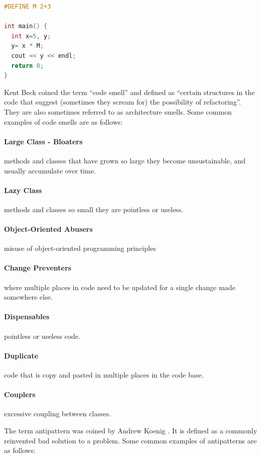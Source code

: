 \documentclass[conference]{IEEEtran}
\begin{document}
\begin{lstlisting}[language=C,frame=single,caption=Example Atom of Confusion,label=pattern1]
#DEFINE M 2+3

int main() {
  int x=5, y;
  y= x * M;
  cout << y << endl;
  return 0;
}
\end{lstlisting}

Kent Beck coined the term ``code smell'' \cite{fowler_refactoring:_2018} and defined as ``certain structures in the code that suggest (sometimes they scream for) the possibility of refactoring''. They are also sometimes referred to as architecture smells.
Some common examples of code smells are as follows:
\paragraph{Large Class - Bloaters} methods and classes that have grown so large they become unsustainable, and usually accumulate over time.
\paragraph{Lazy Class} methods and classes so small they are pointless or useless.
\paragraph{Object-Oriented Abusers} misuse of object-oriented programming principles
\paragraph{Change Preventers} where multiple places in code need to be updated for a single change made somewhere else.
\paragraph{Dispensables} pointless or useless code.
\paragraph{Duplicate} code that is copy and pasted in multiple places in the code base.
\paragraph{Couplers} excessive coupling between classes.

The term antipattern was coined by Andrew Koenig \cite{koenig_patterns_1998}. 
It is defined as a commonly reinvented bad solution to a problem.
Some common examples of antipatterns are as follows:
\end{document}
